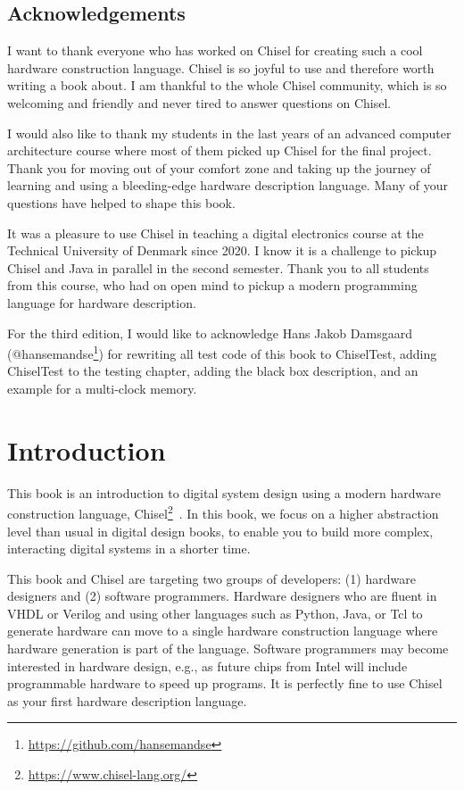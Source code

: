 \documentclass[%
    10pt,
    headinclude, footexclude,
    openright, %
    notitlepage,
    cleardoubleempty,
    headsepline,
    pointlessnumbers,
    bibtotoc, idxtotoc,
    ]{scrbook}
\newcommand{\myref}[2]{\href{#1}{#2}}
\renewcommand{\myref}[2]{{#2}{\footnote{\url{#1}}}}
\begin{document}
\section*{Acknowledgements}

I want to thank everyone who has worked on Chisel for creating such
a cool hardware construction language. Chisel is so joyful to use and
therefore worth writing a book about.
I am thankful to the whole Chisel community, which is so welcoming and friendly
and never tired to answer questions on Chisel.

I would also like to thank my students in the last years of an advanced computer
architecture course where most of them picked up Chisel for the final project.
Thank you for moving out of your comfort zone and taking up the journey of
learning and using a bleeding-edge hardware description language.
Many of your questions have helped to shape this book.

It was a pleasure to use Chisel in teaching a digital electronics
course at the Technical University of Denmark since 2020.
I know it is a challenge to pickup Chisel and Java in parallel in the second
semester. Thank you to all students from this course, who had on open mind to
pickup a modern programming language for hardware description.

For the third edition, I would like to acknowledge Hans Jakob Damsgaard
(\myref{https://github.com/hansemandse}{@hansemandse}) for rewriting
all test code of this book to ChiselTest, adding ChiselTest to the testing chapter, adding the black
box description, and an example for a multi-clock memory.


\mainmatter

\chapter{Introduction}
\label{sec:intro}

This book is an introduction to digital system design using a modern hardware
construction language, \myref{https://www.chisel-lang.org/}{Chisel}~\cite{chisel:dac2012}.
In this book, we focus on a higher abstraction level than usual in digital design books,
to enable you to build more complex, interacting digital systems in a shorter time.

This book and Chisel are targeting two groups of developers:
(1) hardware designers and (2) software programmers.
Hardware designers who are fluent in VHDL or Verilog and using other languages such as Python,
Java, or Tcl to generate hardware can move to a single hardware construction language
where hardware generation is part of the language.
Software programmers may become interested in hardware design,
e.g., as future chips from Intel will include programmable hardware to speed up programs.
It is perfectly fine to use Chisel as your first hardware description language.
\end{document}
